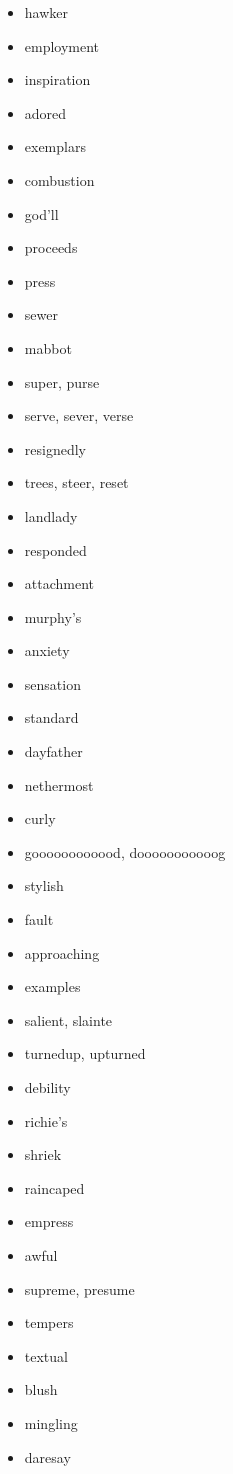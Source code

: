 \documentclass{article}
\begin{document}
\begin{itemize}
    \item hawker
    \item employment
    \item inspiration
    \item adored
    \item exemplars
    \item combustion
    \item god'll
    \item proceeds
    \item press
    \item sewer
    \item mabbot
    \item super, purse
    \item serve, sever, verse
    \item resignedly
    \item trees, steer, reset
    \item landlady
    \item responded
    \item attachment
    \item murphy's
    \item anxiety
    \item sensation
    \item standard
    \item dayfather
    \item nethermost
    \item curly
    \item goooooooooood, dooooooooooog
    \item stylish
    \item fault
    \item approaching
    \item examples
    \item salient, slainte
    \item turnedup, upturned
    \item debility
    \item richie's
    \item shriek
    \item raincaped
    \item empress
    \item awful
    \item supreme, presume
    \item tempers
    \item textual
    \item blush
    \item mingling
    \item daresay

\end{itemize}
\end{document}
